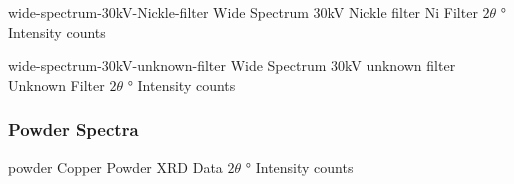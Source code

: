 \documentclass{WitsPhysicsReport}
\begin{document}
\lipsum[20]

                     {wide-spectrum-30kV-Nickle-filter} %
                     {Wide Spectrum 30kV Nickle filter} %
                     {Ni Filter} %
                     {$2 \theta$} %
                     {\si{\degree}} %
                     {Intensity} %
                     {counts} %
                     {%
                     }

                                  {wide-spectrum-30kV-unknown-filter} %
                                  {Wide Spectrum 30kV unknown filter} %
                                  {Unknown Filter} %
                                  {$2 \theta$} %
                                  {\si{\degree}} %
                                  {Intensity} %
                                  {counts} %
                                  {%
                                  }

\lipsum[18]

\subsubsection{Powder Spectra}
\label{subsubsec:Powder_Spectra}

\lipsum[19]

                     {powder} %
                     {Copper Powder XRD} %
                     {Data}
                     {$2 \theta$} %
                     {\si{\degree}} %
                     {Intensity} %
                     {counts} %
                     {%
                     }
\end{document}
